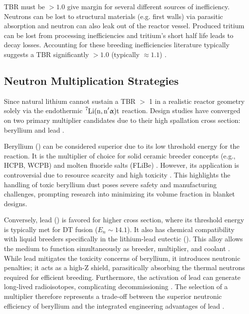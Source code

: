 \documentclass[12pt]{article}
\begin{document}
TBR must be $>1.0$ give margin for several different sources of inefficiency. Neutrons can be lost
to structural materials (e.g. first walls) via parasitic absorption and neutron can also leak out of
the reactor vessel. Produced tritium can be lost from processing inefficiencies and tritium's short
half life leads to decay losses. Accounting for these breeding inefficiencies literature typically
suggests a TBR significantly $> 1.0$ (typically $\approx 1.1$) \cite{shatalov_breeder_1991,
sawan_physics_2006, meschini_modeling_2023, federici_overview_2019}.

\subsection{Neutron Multiplication Strategies}
\label{sec:neutron_multiplication_literature}

Since natural lithium cannot sustain a TBR $>$ 1 in a realistic reactor geometry solely via the
endothermic $\ce{^{7}Li(n, n^\prime\upalpha)t}$ reaction. Design studies have converged on two
primary multiplier candidates due to their high spallation cross section: beryllium and lead
\cite{hernandez_first_2018}.

Beryllium () can be considered superior due to its low threshold energy for the  reaction. It is the multiplier of choice for solid ceramic breeder concepts (e.g., HCPB, WCPB)
and molten fluoride salts (FLiBe) \cite{wang_current_2019, tas_liquid_1988, sorbom_arc_2015}.
However, its application is controversial due to resource scarcity and high toxicity
\cite{shimwell_reducing_2016}. This highlights the handling of toxic beryllium dust poses severe
safety and manufacturing challenges, prompting research into minimizing its volume fraction in
blanket designs.

Conversely, lead () is favored for higher  cross section, where its threshold
energy is typically met for DT fusion ($E_n \sim 14.1$). It also has chemical compatibility
with liquid breeders specifically in the lithium-lead eutectic (). This alloy allows
the medium to function simultaneously as breeder, multiplier, and coolant \cite{wu_overview_2011}.
While lead mitigates the toxicity concerns of beryllium, it introduces neutronic penalties; it acts
as a high-Z shield, parasitically absorbing the thermal neutrons required for efficient 
breeding. Furthermore, the activation of lead can generate long-lived radioisotopes, complicating
decommissioning \cite{bocci_arc_2020}. The selection of a multiplier therefore represents a
trade-off between the superior neutronic efficiency of beryllium and the integrated engineering
advantages of lead \cite{hernandez_first_2018}.
\end{document}
